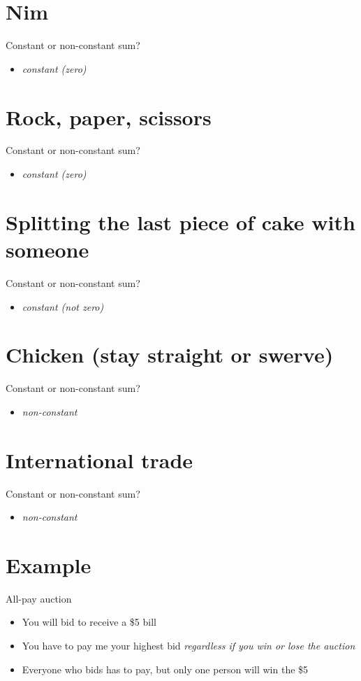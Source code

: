 \documentclass[11pt]{article}
\begin{document}
\section*{Nim}
\label{sec:org5b4869f}
Constant or non-constant sum?
\begin{itemize}
\item \emph{constant (zero)}
\end{itemize}

\section*{Rock, paper, scissors}
\label{sec:org334f0d8}
Constant or non-constant sum?
\begin{itemize}
\item \emph{constant (zero)}
\end{itemize}

\section*{Splitting the last piece of cake with someone}
\label{sec:orgb700590}
Constant or non-constant sum?
\begin{itemize}
\item \emph{constant (not zero)}
\end{itemize}

\section*{Chicken (stay straight or swerve)}
\label{sec:org57e4e2d}
Constant or non-constant sum?
\begin{itemize}
\item \emph{non-constant}
\end{itemize}

\section*{International trade}
\label{sec:orgaf0fb8f}
Constant or non-constant sum?
\begin{itemize}
\item \emph{non-constant}
\end{itemize}

\section*{Example}
\label{sec:org239636f}
All-pay auction
\begin{itemize}
\item You will bid to receive a \$5 bill
\item You have to pay me your highest bid \emph{regardless if you win or lose the auction}
\item Everyone who bids has to pay, but only one person will win the \$5
\end{itemize}
\end{document}
